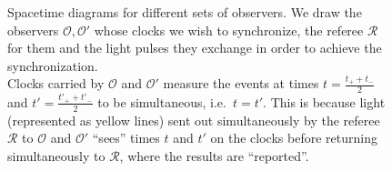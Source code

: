 \begin{figure}
\begin{minipage}{0.5\textwidth}
{
}
\end{minipage}%
\begin{minipage}{0.5\textwidth}
\caption{Spacetime diagrams for different sets of observers. We draw the observers $\mathcal{O}, \mathcal{O}'$ whose clocks we wish to synchronize, the referee $\mathcal{R}$ for them and the light pulses they exchange in order to achieve the synchronization.\\
Clocks carried by $\mathcal{O}$ and $\mathcal{O}'$ measure the events at times $t = \frac{t_+ + t_-}{2}$ and $t' = \frac{t'_+ + t'_-}{2}$ to be simultaneous, i.e.~$t = t'$. This is because light (represented as yellow lines) sent out simultaneously by the referee $\mathcal{R}$ to $\mathcal{O}$ and $\mathcal{O}'$ \enquote{sees} times $t$ and $t'$ on the clocks before returning simultaneously to $\mathcal{R}$, where the results are \enquote{reported}.}
\label{fig:clocks_at_rest_wrt_each_other}
\end{minipage}
\end{figure}



